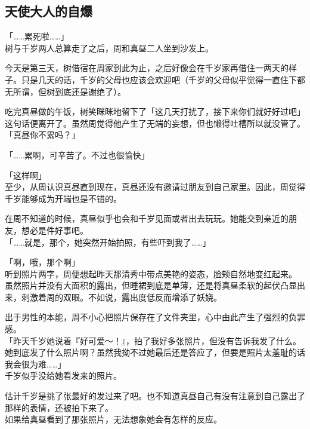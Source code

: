\subsection{天使大人的自爆}

「……累死啦……」\\

树与千岁两人总算走了之后，周和真昼二人坐到沙发上。

今天是第三天，树借宿在周家到此为止，之后好像会在千岁家再借住一两天的样子。只是几天的话，千岁的父母也应该会欢迎吧（千岁的父母似乎觉得一直住下都无所谓，但树到底还是谢绝了）。

吃完真昼做的午饭，树笑眯眯地留下了「这几天打扰了，接下来你们就好好过吧」这句话便离开了。虽然周觉得他产生了无端的妄想，但也懒得吐槽所以就没管了。\\

「真昼你不累吗？」

「……累啊，可辛苦了。不过也很愉快」

「这样啊」\\

至少，从周认识真昼直到现在，真昼还没有邀请过朋友到自己家里。因此，周觉得千岁能够成为开端也是不错的。

在周不知道的时候，真昼似乎也会和千岁见面或者出去玩玩。她能交到亲近的朋友，想必是件好事吧。\\

「……就是，那个，她突然开始拍照，有些吓到我了……」

「啊，哦，那个啊」\\

听到照片两字，周便想起昨天那清秀中带点美艳的姿态，脸颊自然地变红起来。\\

虽然照片并没有大面积的露出，但睡裙到底是单薄，还是将真昼柔软的起伏凸显出来，刺激着周的双眼。不如说，露出度低反而增添了妖娆。

出于男性的本能，周不小心把照片保存在了文件夹里，心中由此产生了强烈的负罪感。\\

「昨天千岁她说着『好可爱～！』，拍了我好多张照片，但没有告诉我发了什么。她到底发了什么照片啊？虽然我拗不过她最后还是答应了，但要是照片太羞耻的话我会很为难……」\\

千岁似乎没给她看发来的照片。

估计千岁是挑了张最好的发过来了吧。也不知道真昼自己有没有注意到自己露出了那样的表情，还被拍下来了。\\

如果给真昼看到了那张照片，无法想象她会有怎样的反应。


